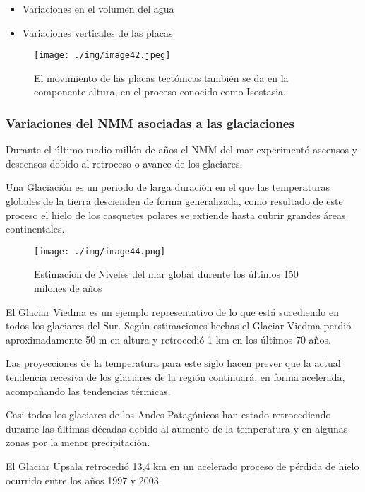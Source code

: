 \documentclass[
  a4paper,12pt]{extarticle}
\providecommand{\tightlist}{%
  \setlength{\itemsep}{0pt}\setlength{\parskip}{0pt}}
\begin{document}
\begin{itemize}
\tightlist
\item
  Variaciones en el volumen del agua
\item
  Variaciones verticales de las placas
\end{itemize}

\begin{figure}
\centering
\texttt{[image: ./img/image42.jpeg]}
\caption{El movimiento de las placas tectónicas también se da en la
componente altura, en el proceso conocido como Isostasia.}
\end{figure}

\hypertarget{variaciones-del-nmm-asociadas-a-las-glaciaciones}{%
\subsubsection{Variaciones del NMM asociadas a las
glaciaciones}\label{variaciones-del-nmm-asociadas-a-las-glaciaciones}}

Durante el último medio millón de años el NMM del mar experimentó
ascensos y descensos debido al retroceso o avance de los glaciares.

Una Glaciación es un periodo de larga duración en el que las
temperaturas globales de la tierra descienden de forma generalizada,
como resultado de este proceso el hielo de los casquetes polares se
extiende hasta cubrir grandes áreas continentales.

\begin{figure}
\centering
\texttt{[image: ./img/image44.png]}
\caption{Estimacion de Niveles del mar global durente los últimos 150
milones de años}
\end{figure}

El Glaciar Viedma es un ejemplo representativo de lo que está sucediendo
en todos los glaciares del Sur. Según estimaciones hechas el Glaciar
Viedma perdió aproximadamente 50 m en altura y retrocedió 1 km en los
últimos 70 años.

Las proyecciones de la temperatura para este siglo hacen prever que la
actual tendencia recesiva de los glaciares de la región continuará, en
forma acelerada, acompañando las tendencias térmicas.

Casi todos los glaciares de los Andes Patagónicos han estado
retrocediendo durante las últimas décadas debido al aumento de la
temperatura y en algunas zonas por la menor precipitación.

El Glaciar Upsala retrocedió 13,4 km en un acelerado proceso de pérdida
de hielo ocurrido entre los años 1997 y 2003.
\end{document}
